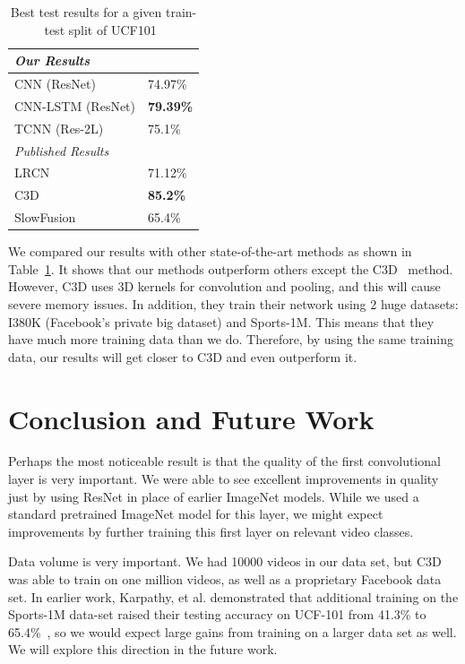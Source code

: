 \begin{table}[h!]
 \caption{Best test results for a given train-test split of UCF101~\cite{ucf101}}\label{tab:cmp}
\centering
 \begin{tabular}{||l l||}
 \hline
 \textit{Our Results} & \\ \hline
 CNN (ResNet) & 74.97\% \\
 CNN-LSTM (ResNet) & \textbf{79.39\%} \\
 TCNN (Res-2L) & 75.1\% \\ \hline
 \textit{Published Results} & \\ \hline
 LRCN~\cite{byeon2015scene} & 71.12\% \\
 C3D~\cite{stf} & \textbf{85.2\%}\footnotemark \\
 SlowFusion~\cite{cnnvid} & 65.4\%\\ [0.5ex]
 \hline
 \end{tabular}
\end{table}

We compared our results with other state-of-the-art methods as shown in Table~\ref{tab:cmp}. It shows that our methods outperform others except the C3D~\cite{stf} method. However, C3D uses 3D kernels for convolution and pooling, and this will cause severe memory issues. In addition, they train their network using 2 huge datasets: I380K (Facebook's private big dataset) and Sports-1M. This means that they have much more training data than we do. Therefore, by using the same training data, our results will get closer to C3D and even outperform it.

\section{Conclusion and Future Work}
Perhaps the most noticeable result is that the quality of the first convolutional layer is very important. We were able to see excellent improvements in quality just by using ResNet in place of earlier ImageNet models. While we used a standard pretrained ImageNet model for this layer, we might expect improvements by further training this first layer on relevant video classes. 

Data volume is very important. We had 10000 videos in our data set, but C3D was able to train on one million videos, as well as a proprietary Facebook data set. In earlier work, Karpathy, et al. demonstrated that additional training on the Sports-1M data-set raised their testing accuracy on UCF-101 from 41.3\% to 65.4\%~\cite{cnnvid}, so we would expect large gains from training on a larger data set as well. We will explore this direction in the future work. 

